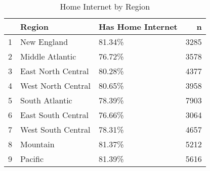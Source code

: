 \begin{table}[ht]
\centering
\begin{tabular}{rllr}
  \hline
 & Region & Has Home Internet & n \\ 
  \hline
1 & New England & 81.34\% & 3285 \\ 
  2 & Middle Atlantic & 76.72\% & 3578 \\ 
  3 & East North Central & 80.28\% & 4377 \\ 
  4 & West North Central & 80.65\% & 3958 \\ 
  5 & South Atlantic & 78.39\% & 7903 \\ 
  6 & East South Central & 76.66\% & 3064 \\ 
  7 & West South Central & 78.31\% & 4657 \\ 
  8 & Mountain & 81.37\% & 5212 \\ 
  9 & Pacific & 81.39\% & 5616 \\ 
   \hline
\end{tabular}
\caption{Home Internet by Region} 
\end{table}
